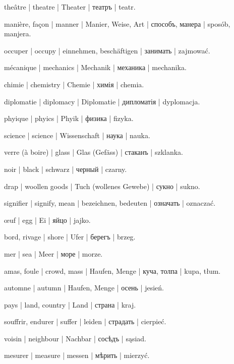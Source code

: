 \begin{ekzvocab}{1em}
 theâtre | theatre | Theater | театръ | teatr.

 manière, façon | manner | Manier, Weise, Art | способъ, манера | sposób, manjera.

 occuper | occupy | einnehmen, beschäftigen | занимать | zajmować.

 mécanique | mechanics | Mechanik | механика | mechanika.

 chimie | chemistry | Chemie | химія | chemia.

 diplomatie | diplomacy | Diplomatie | дипломатія | dyplomacja.

 phyique | phyics | Phyik | физика | fizyka.

 science | science | Wissenschaft | наука | nauka.

 verre (à boire) | glass | Glas (Gefäss) | стаканъ | szklanka.

 noir | black | schwarz | черный | czarny.

 drap | woollen goods | Tuch (wollenes Gewebe) | сукно | sukno.

 signifier | signify, mean | bezeichnen, bedeuten | означать | oznaczać.

 œuf | egg | Ei | яйцо | jajko.

 bord, rivage | shore | Ufer | берегъ | brzeg.

 mer | sea | Meer | море | morze.

 amas, foule | crowd, mass | Haufen, Menge | куча, толпа | kupa, tłum.

 automne | autumn | Haufen, Menge | осень | jesień.

 pays | land, country | Land | страна | kraj.

 souffrir, endurer | suffer | leiden | страдать | cierpieć.

 voisin | neighbour | Nachbar | сосѣдъ | sąsiad.

 mesurer | measure | messen | мѣрить | mierzyć.

\end{ekzvocab}



